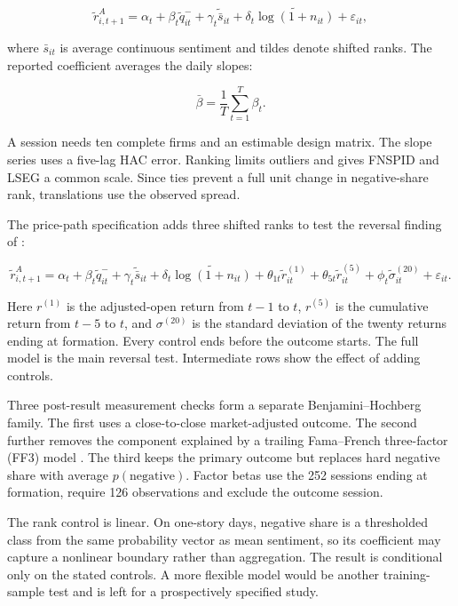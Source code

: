 \begin{equation}
 \widetilde r^A_{i,t+1}=\alpha_t+\beta_t\widetilde q^{-}_{it}
 +\gamma_t\widetilde{\bar s}_{it}
 +\delta_t\widetilde{\log(1+n_{it})}+\varepsilon_{it},
 \label{eq:conditional-base}
\end{equation}

\noindent where $\bar s_{it}$ is average continuous sentiment and tildes denote
shifted ranks. The reported coefficient averages the daily slopes:

\begin{equation}
 \bar\beta=\frac{1}{T}\sum_{t=1}^{T}\beta_t.
 \label{eq:mean-beta}
\end{equation}

A session needs ten complete firms and an estimable design matrix. The slope
series uses a five-lag HAC error. Ranking limits outliers and gives FNSPID and
LSEG a common scale. Since ties prevent a full unit change in negative-share
rank, translations use the observed spread.

The price-path specification adds three shifted ranks to test the reversal
finding of \citet{chan2003news}:

\begin{equation}
 \widetilde r^A_{i,t+1}=\alpha_t+\beta_t\widetilde q^{-}_{it}
 +\gamma_t\widetilde{\bar s}_{it}+\delta_t\widetilde{\log(1+n_{it})}
 +\theta_{1t}\widetilde r^{(1)}_{it}+\theta_{5t}\widetilde r^{(5)}_{it}
 +\phi_t\widetilde\sigma^{(20)}_{it}+\varepsilon_{it}.
 \label{eq:conditional-full}
\end{equation}

\noindent Here $r^{(1)}$ is the adjusted-open return from $t-1$ to $t$,
$r^{(5)}$ is the cumulative return from $t-5$ to $t$, and $\sigma^{(20)}$ is the
standard deviation of the twenty returns ending at formation. Every control
ends before the outcome starts. The full model is the main reversal test.
Intermediate rows show the effect of adding controls.

Three post-result measurement checks form a separate Benjamini--Hochberg family.
The first uses a close-to-close market-adjusted outcome. The second further
removes the component explained by a trailing Fama--French three-factor (FF3)
model \citep{famafrench1993}. The third keeps the primary outcome but replaces
hard negative share with average $p(\mathrm{negative})$. Factor betas use the
252 sessions ending at formation, require 126 observations and exclude the
outcome session.

The rank control is linear. On one-story days, negative share is a thresholded
class from the same probability vector as mean sentiment, so its coefficient may
capture a nonlinear boundary rather than aggregation. The result is conditional
only on the stated controls. A more flexible model would be another
training-sample test and is left for a prospectively specified study.

